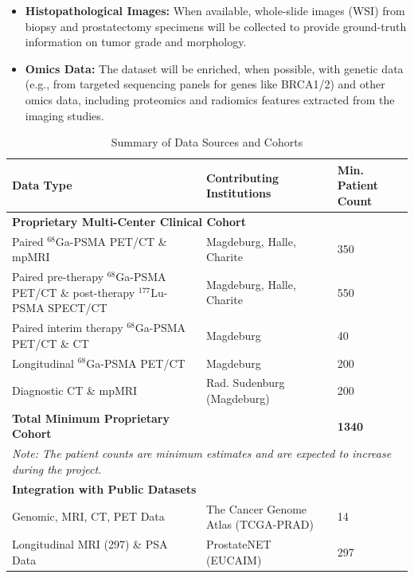 \documentclass[11pt, a4paper]{article}
\begin{document}
\begin{itemize}
    \item \textbf{Histopathological Images:} When available, whole-slide images (WSI) from biopsy and prostatectomy specimens will be collected to provide ground-truth information on tumor grade and morphology.
    \item \textbf{Omics Data:} The dataset will be enriched, when possible, with genetic data (e.g., from targeted sequencing panels for genes like BRCA1/2) and other omics data, including proteomics and radiomics features extracted from the imaging studies.
\end{itemize}

\begin{table}[H]
\caption{Summary of Data Sources and Cohorts}
\label{tab:data}
\begin{tabular}{p{} p{} p{}}
\toprule
\textbf{Data Type} & \textbf{Contributing Institutions} & \textbf{Min. Patient Count} \\
\midrule
\multicolumn{3}{l}{\textbf{Proprietary Multi-Center Clinical Cohort}} \\
\midrule
Paired $^{68}$Ga-PSMA PET/CT \& mpMRI & Magdeburg, Halle, Charite & 350 \\
\cmidrule(lr){1-3}
Paired pre-therapy $^{68}$Ga-PSMA PET/CT \& post-therapy $^{177}$Lu-PSMA SPECT/CT & Magdeburg, Halle, Charite & 550 \\
\cmidrule(lr){1-3}
Paired interim therapy $^{68}$Ga-PSMA PET/CT \& CT & Magdeburg & 40 \\
\cmidrule(lr){1-3}
Longitudinal $^{68}$Ga-PSMA PET/CT & Magdeburg & 200 \\
\cmidrule(lr){1-3}
Diagnostic CT \& mpMRI & Rad. Sudenburg (Magdeburg) & 200 \\
\midrule
\textbf{Total Minimum Proprietary Cohort} & & \textbf{1340} \\
\midrule
\multicolumn{3}{p{\dimexpr\linewidth-2\tabcolsep}}{\small\textit{Note: The patient counts are minimum estimates and are expected to increase during the project.}} \\
\midrule
\multicolumn{3}{l}{\textbf{Integration with Public Datasets}} \\
\midrule
Genomic, MRI, CT, PET Data & The Cancer Genome Atlas (TCGA-PRAD) \cite{zuley2016cancer} & 14 \\
\cmidrule(lr){1-3}
Longitudinal MRI (297) \& PSA Data & ProstateNET (EUCAIM) \cite{prostateNetArchive} & 297 \\
\bottomrule
\end{tabular}
\end{table}
\end{document}
